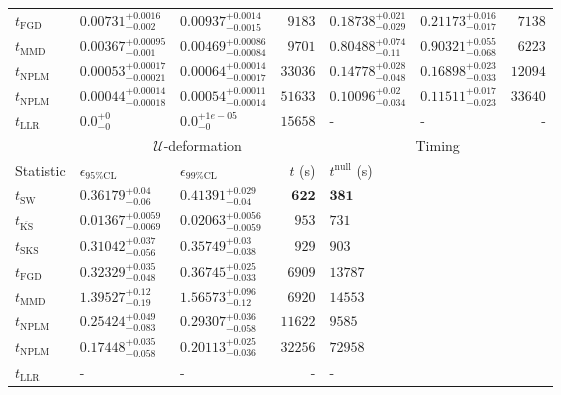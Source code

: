 \begin{tabular}{l|llr|llr}
	$t_{\mathrm{FGD}}$ & $0.00731_{-0.002}^{+0.0016}$ & $0.00937_{-0.0015}^{+0.0014}$ & $9183$ & $0.18738_{-0.029}^{+0.021}$ & $0.21173_{-0.017}^{+0.016}$ & $7138$ \\
	$t_{\mathrm{MMD}}$ & $0.00367_{-0.001}^{+0.00095}$ & $0.00469_{-0.00084}^{+0.00086}$ & $9701$ & $0.80488_{-0.11}^{+0.074}$ & $0.90321_{-0.068}^{+0.055}$ & $6223$ \\
\rowcolor{red!35}	$t_{\mathrm{NPLM}}$ & $0.00053_{-0.00021}^{+0.00017}$ & $0.00064_{-0.00017}^{+0.00014}$ & $33036$ & $0.14778_{-0.048}^{+0.028}$ & $0.16898_{-0.033}^{+0.023}$ & $12094$ \\
\rowcolor{blue!35}	$t_{\mathrm{NPLM}}$ & $0.00044_{-0.00018}^{+0.00014}$ & $0.00054_{-0.00014}^{+0.00011}$ & $51633$ & $0.10096_{-0.034}^{+0.02}$ & $0.11511_{-0.023}^{+0.017}$ & $33640$ \\
	$t_{\mathrm{LLR}}$ & $0.0_{-0}^{+0}$ & $0.0_{-0}^{+1e-05}$ & $15658$ & - & - & - \\
	\toprule
	\multicolumn{1}{c}{} & \multicolumn{3}{c}{$\mathcal{U}$-deformation} & \multicolumn{3}{c}{Timing} \\
	Statistic & $\epsilon_{95\%\mathrm{CL}}$ & $\epsilon_{99\%\mathrm{CL}}$ & $t$ (s) & $t^{\mathrm{null}}$ (s) \\
	\midrule
	$t_{\mathrm{SW}}$ & $0.36179_{-0.06}^{+0.04}$ & $0.41391_{-0.04}^{+0.029}$ & ${\mathbf{622}}$ & ${\mathbf{381}}$ \\
	$t_{\overline{\mathrm{KS}}}$ & ${\mathbf{0.01367_{-0.0069}^{+0.0059}}}$ & ${\mathbf{0.02063_{-0.0059}^{+0.0056}}}$ & $953$ & $731$ \\
	$t_{\mathrm{SKS}}$ & $0.31042_{-0.056}^{+0.037}$ & $0.35749_{-0.038}^{+0.03}$ & $929$ & $903$ \\
	$t_{\mathrm{FGD}}$ & $0.32329_{-0.048}^{+0.035}$ & $0.36745_{-0.033}^{+0.025}$ & $6909$ & $13787$ \\
	$t_{\mathrm{MMD}}$ & $1.39527_{-0.19}^{+0.12}$ & $1.56573_{-0.12}^{+0.096}$ & $6920$ & $14553$ \\
\rowcolor{red!35}	$t_{\mathrm{NPLM}}$ & $0.25424_{-0.083}^{+0.049}$ & $0.29307_{-0.058}^{+0.036}$ & $11622$ & $9585$ \\
\rowcolor{blue!35}	$t_{\mathrm{NPLM}}$ & $0.17448_{-0.058}^{+0.035}$ & $0.20113_{-0.036}^{+0.025}$ & $32256$ & $72958$ \\
	$t_{\mathrm{LLR}}$ & - & - & - & - \\
	\bottomrule
\end{tabular}